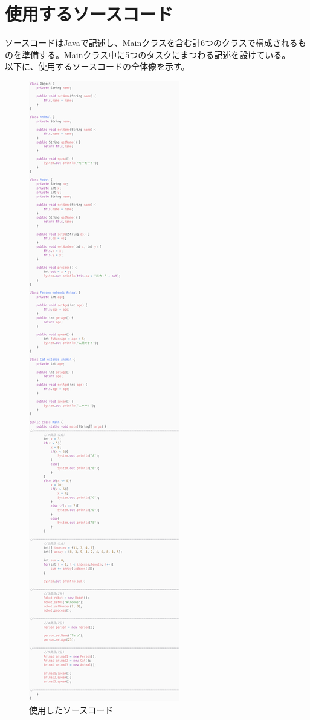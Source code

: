 \documentclass[paper=a4paper,fontsize=11pt]{jlreq}
\begin{document}
  \section{使用するソースコード}
    ソースコードはJavaで記述し、Mainクラスを含む計6つのクラスで構成されるものを準備する。Mainクラス中に5つのタスクにまつわる記述を設けている。\\
    以下に、使用するソースコードの全体像を示す。
    \begin{figure}[h]
      \centering
      \includegraphics[height=\textheight]{carbon_clip_resized.png}
      \caption{使用したソースコード}
    \end{figure}
    \FloatBarrier
\end{document}
